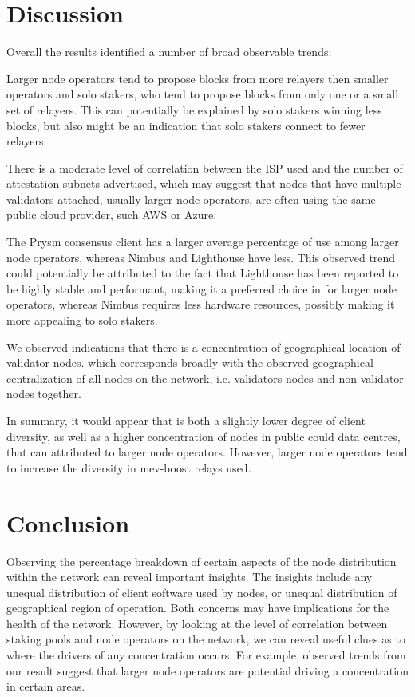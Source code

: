 \documentclass[conference]{IEEEtran}
\begin{document}
\section{Discussion}

Overall the results identified a number of broad observable trends:

Larger node operators tend to propose blocks from more relayers then smaller operators and solo stakers, who tend to propose blocks from only one or a small set of relayers.  This can potentially be explained by solo stakers winning less blocks, but also might be an indication that solo stakers connect to fewer relayers.

There is a moderate level of correlation between the ISP used and the number of attestation subnets advertised, which may suggest that nodes that have multiple validators attached, usually larger node operators, are often using the same public cloud provider, such AWS or Azure.

The Prysm consensus client has a larger average percentage of use among larger node operators, whereas Nimbus and Lighthouse have less. This observed trend could potentially be attributed to the fact that Lighthouse has been reported to be highly stable and performant, making it a preferred choice in for larger node operators, whereas Nimbus requires less hardware resources, possibly making it more appealing to solo stakers.

We observed indications that there is a concentration of geographical location of validator nodes. which corresponds broadly with the observed geographical centralization of all nodes on the network, i.e. validators nodes and non-validator nodes together.

In summary, it would appear that is both a slightly lower degree of client diversity, as well as a higher concentration of nodes in public could data centres, that can attributed to larger node operators.  However, larger node operators tend to increase the diversity in mev-boost relays used.

\section{Conclusion}

Observing the percentage breakdown of certain aspects of the node distribution within the network can reveal important insights.  The insights include any unequal distribution of client software used by nodes, or unequal distribution of geographical region of operation.  Both concerns may have implications for the health of the network.  However, by looking at the level of correlation between staking pools and node operators on the network, we can reveal useful clues as to where the drivers of any concentration occurs.  For example, observed trends from our result suggest that larger node operators are potential driving a concentration in certain areas.
\end{document}
